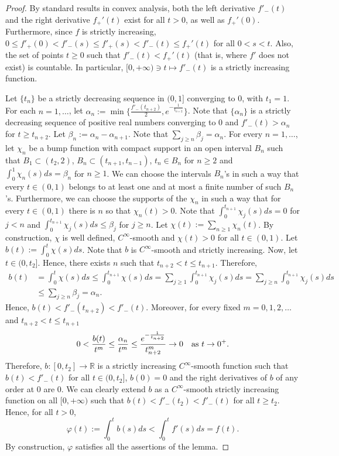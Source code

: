 \documentclass[10pt,a4paper]{amsart}
\def\R{\mathbb R}
\begin{document}
\begin{proof}
By standard results in convex analysis,  both the left derivative $f'_-(t)$ and the right  derivative $f_+'(t)$  exist for all $t> 0$, as well as $f_+'(0)$. Furthermore, since $f$ is strictly increasing, $0\leq f'_+(0)<f'_-(s)\leq f'_+(s)<f'_-(t)\leq f_+'(t)$ for all $0<s<t$.  Also, the set of points $t\geq 0$ such that $f'_-(t)<f_+'(t)$ (that is, where $f'$ does not exist) is countable. In particular, $[0,+\infty)\ni t\mapsto f'_-(t)$ is a strictly increasing function. 

Let $\{t_n\}$ be a strictly decreasing sequence in $(0,1]$ converging to $0$, with $t_1=1$. For each $n=1,\ldots$, let $\alpha_n:=\min\{\frac{f'_-(t_{n+2})}{2}, e^{-\frac{1}{t_{n+2}}}\}$. Note that $\{\alpha_n\}$ is a strictly decreasing sequence of positive real numbers converging to $0$ and $f'_-(t)>\alpha_n$ for $t\geq t_{n+2}$. Let $\beta_n:=\alpha_n-\alpha_{n+1}$. Note that $\sum_{j\geq n}\beta_j=\alpha_n$. For every $n=1,\ldots$, let $\chi_n$ be a bump function with compact support in an open interval $B_n$ such that $B_1\subset (t_2, 2)$, $B_n\subset (t_{n+1}, t_{n-1})$, $t_n\in B_n$ for $n\geq 2$ and  $\int_0^1\chi_n(s)ds=\beta_n$ for $n\geq 1$. We can choose the intervals $B_n$'s in such a way that every $t\in (0,1)$ belongs to at least one and at most a finite number of such $B_n$'s. Furthermore, we can choose the supports of the $\chi_n$ in such a way that for every $t\in (0,1)$ there is $n$ so that $\chi_n(t)>0$. Note that $\int_0^{t_{n+1}} \chi_j(s)ds=0$ for $j<n$ and $\int_0^{t_{n+1}}\chi_j(s)ds\leq \beta_j$ for $j\geq n$.  Let $\chi(t):=\sum_{n\geq 1}\chi_n(t)$. By construction, $\chi$ is well defined, $C^\infty$-smooth and $\chi(t)>0$ for all $t\in (0,1)$. Let $b(t):=\int_0^t \chi(s)ds$. Note that $b$ is $C^\infty$-smooth and strictly increasing. Now, let $t\in (0,t_2]$. Hence, there exists $n$ such that $t_{n+2}<t\leq t_{n+1}$. Therefore, 
 \begin{equation*}
 \begin{split}
b(t)&=\int_0^t \chi(s)ds\leq \int_0^{t_{n+1}} \chi(s)ds=\sum_{j\geq 1}\int_0^{t_{n+1}}\chi_j(s)ds=\sum_{j\geq n}\int_0^{t_{n+1}}\chi_j(s)ds\\&\leq \sum_{j\geq n}\beta_j=\alpha_{n}.
 \end{split}
 \end{equation*}
Hence, $b(t)< f'_-(t_{n+2})<f'_-(t)$. Moreover, for every fixed $m=0,1,2,\ldots$ and $t_{n+2}<t\leq t_{n+1}$
 \[
0<\frac{b(t)}{t^m}\leq \frac{\alpha_n}{t^m}\leq \frac{e^{-\frac{1}{t_{n+2}}}}{t_{n+2}^m}\to 0 \quad \hbox{as\ }t\to 0^+.
 \]
Therefore, $b:[0,t_2]\to\R$ is a strictly increasing $C^\infty$-smooth function such that $b(t)< f'_-(t)$ for all $t\in (0,t_2]$, $b(0)=0$ and the right derivatives of $b$ of any order at $0$ are $0$. We can clearly extend $b$ as a $C^\infty$-smooth strictly increasing function on all $[0,+\infty)$ such that $b(t)< f'_-(t_2)<f'_-(t)$ for all $t\geq t_2$. Hence, for all $t>0$,
\[
\varphi(t):=\int_0^t b(s)ds<\int_0^t f'(s)ds=f(t).
\]
By construction, $\varphi$ satisfies all the assertions of the lemma.
\end{proof}
\end{document}
